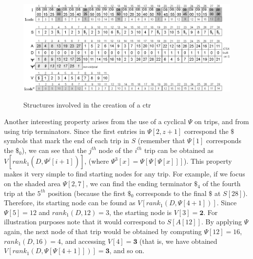 
\begin{figure}[h!]
  \begin{center}
  {\includegraphics[width=1.00\textwidth]{figures/csttr.eps}}
  \end{center}
  \caption{Structures involved in the creation of a \acrshort{ctr}}
  \label{fig:tcsa}
\end{figure}



Another interesting property arises from the use of a cyclical $\Psi$ on trips, and from using trip terminators.
Since the first entries in $\Psi[2,z+1]$ correspond the $\$$ symbols that 
mark the end of each trip in $S$ (remember that $\Psi[1]$ corresponds the $\$_0$), we
can see that the $j^{th}$ node of the $i^{th}$ trip can
be obtained as $V[rank_1(D, \Psi^j[i+1])]$, (where $\Psi^3[x]= \Psi[\Psi[\Psi[x]]]$). This property
makes it very simple to find starting nodes for any trip.
For example, if we focus on the shaded area $\Psi[2,7]$, we can find the ending terminator $\$_4$ of the
fourth trip at the $5^{th}$ position (because the first $\$_0$
corresponds to the final $\$$ at $S[28]$). Therefore, its starting node can be found 
as $V[rank_1(D, \Psi[4+1])]$. Since $\Psi[5] = 12$ and $rank_1(D,12)= 3$, 
the starting node is $V[3]=\mathbf{2}$. For illustration purposes note that it would correspond to $S[A[12]]$.
By applying $\Psi$ again, the next node of that trip would be obtained by computing $\Psi[12] = 16$, 
$rank_1(D,16)=4$, and accessing $V[4]=\mathbf{3}$  (that is, we have obtained 
 $V[rank_1(D, \Psi[\Psi[4+1]])]=\mathbf{3}$, and so on. 


